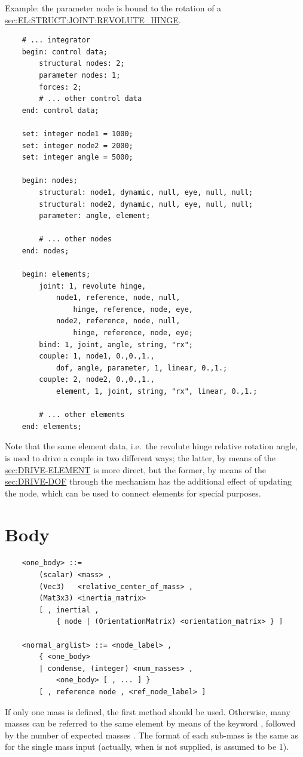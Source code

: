 Example: the parameter node  is bound to the rotation of a 
\hyperref{\kw{revolute hinge}}{\kw{revolute hinge} (see Section~}{)}{sec:EL:STRUCT:JOINT:REVOLUTE_HINGE}.
\begin{verbatim}
    # ... integrator
    begin: control data;
        structural nodes: 2;
        parameter nodes: 1;
        forces: 2;
        # ... other control data
    end: control data;

    set: integer node1 = 1000;
    set: integer node2 = 2000;
    set: integer angle = 5000;

    begin: nodes;
        structural: node1, dynamic, null, eye, null, null;
        structural: node2, dynamic, null, eye, null, null;
        parameter: angle, element;

        # ... other nodes
    end: nodes;

    begin: elements;
        joint: 1, revolute hinge,
            node1, reference, node, null,
                hinge, reference, node, eye,
            node2, reference, node, null,
                hinge, reference, node, eye;
        bind: 1, joint, angle, string, "rx";
        couple: 1, node1, 0.,0.,1.,
            dof, angle, parameter, 1, linear, 0.,1.;
        couple: 2, node2, 0.,0.,1.,
            element, 1, joint, string, "rx", linear, 0.,1.;

        # ... other elements
    end: elements;
\end{verbatim}
Note that the same element data, i.e.\ the revolute hinge
relative rotation angle, is used to drive a couple in two different
ways; the latter, by means of the 
\hyperref{\kw{element} drive}{\kw{element} drive (see Section~}{)}{sec:DRIVE-ELEMENT}
is more direct, but the former, by means of the 
\hyperref{\kw{dof} drive}{\kw{dof} drive (see Section~}{)}{sec:DRIVE-DOF}
through the  mechanism has the additional effect of updating
the  node, which can be used to connect  elements 
for special purposes.



\section{Body}
\begin{verbatim}
    <one_body> ::=
        (scalar) <mass> , 
        (Vec3)   <relative_center_of_mass> ,
        (Mat3x3) <inertia_matrix>
        [ , inertial , 
            { node | (OrientationMatrix) <orientation_matrix> } ]

    <normal_arglist> ::= <node_label> ,
        { <one_body>
        | condense, (integer) <num_masses> ,
            <one_body> [ , ... ] }
        [ , reference node , <ref_node_label> ]
\end{verbatim}
If only one mass is defined, the first method should be used. Otherwise,
many masses can be referred to the same element by means of the keyword
, followed by the number of expected masses .
The format of each sub-mass is the same as for the single mass input (actually, 
when  is not supplied,  is assumed to be 1).


